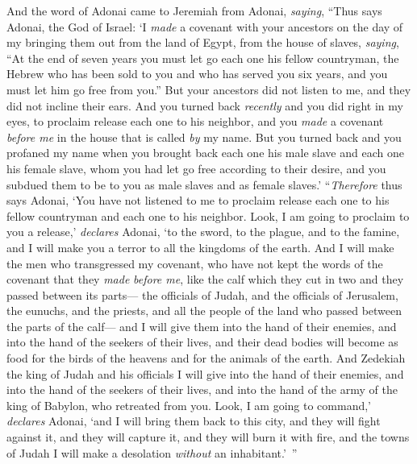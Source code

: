\begin{biblechapter}
\verse And the word of Adonai came to Jeremiah from Adonai, \textit{saying},
\verse “Thus says Adonai, the God of Israel: ‘I \textit{made} a covenant with your ancestors on the day of my bringing them out from the land of Egypt, from the house of slaves, \textit{saying},
\verse “At the end of seven years you must let go each one his fellow countryman, the Hebrew who has been sold to you and who has served you six years, and you must let him go free from you.” But your ancestors did not listen to me, and they did not incline their ears.
\verse And you turned back \textit{recently} and you did right in my eyes, to proclaim release each one to his neighbor, and you \textit{made} a covenant \textit{before me} in the house that is called \textit{by} my name.
\verse But you turned back and you profaned my name when you brought back each one his male slave and each one his female slave, whom you had let go free according to their desire, and you subdued them to be to you as male slaves and as female slaves.’
\verse “\textit{Therefore} thus says Adonai, ‘You have not listened to me to proclaim release each one to his fellow countryman and each one to his neighbor. Look, I am going to proclaim to you a release,’ \textit{declares} Adonai, ‘to the sword, to the plague, and to the famine, and I will make you a terror to all the kingdoms of the earth.
\verse And I will make the men who transgressed my covenant, who have not kept the words of the covenant that they \textit{made} \textit{before me}, like the calf which they cut in two and they passed between its parts—
\verse the officials of Judah, and the officials of Jerusalem, the eunuchs, and the priests, and all the people of the land who passed between the parts of the calf—
\verse and I will give them into the hand of their enemies, and into the hand of the seekers of their lives, and their dead bodies will become as food for the birds of the heavens and for the animals of the earth.
\verse And Zedekiah the king of Judah and his officials I will give into the hand of their enemies, and into the hand of the seekers of their lives, and into the hand of the army of the king of Babylon, who retreated from you.
\verse Look, I am going to command,’ \textit{declares} Adonai, ‘and I will bring them back to this city, and they will fight against it, and they will capture it, and they will burn it with fire, and the towns of Judah I will make a desolation \textit{without} an inhabitant.’ ”
\end{biblechapter}

